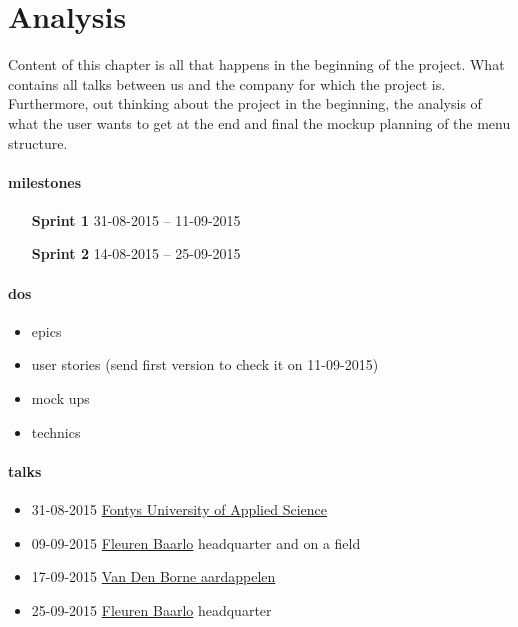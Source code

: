\section{Analysis}
Content of this chapter is all that happens in the beginning of the project. What contains all talks between us and the company for which the project is. Furthermore, out thinking about the project in the beginning, the analysis of what the user wants to get at the end and final the mockup planning of the menu structure.

\paragraph{milestones}
\begin{itemize}
	\item[\textbf{Sprint 1}] 31-08-2015 -- 11-09-2015 
	\item[\textbf{Sprint 2}] 14-08-2015 -- 25-09-2015 
\end{itemize}

\paragraph{dos}
\begin{itemize}
	\item epics
	\item user stories (send first version to check it on 11-09-2015)
	\item mock ups
	\item technics
\end{itemize}

\paragraph{talks}
\begin{itemize}
	\item 31-08-2015 \href{http://fontys.nl}{Fontys University of Applied Science}
	\item 09-09-2015 \href{http://fleuren.net}{Fleuren Baarlo} headquarter and on a field
	\item 17-09-2015 \href{http://www.vandenborneaardappelen.com}{Van Den Borne aardappelen} 
	\item 25-09-2015 \href{http://fleuren.net}{Fleuren Baarlo} headquarter
\end{itemize}
